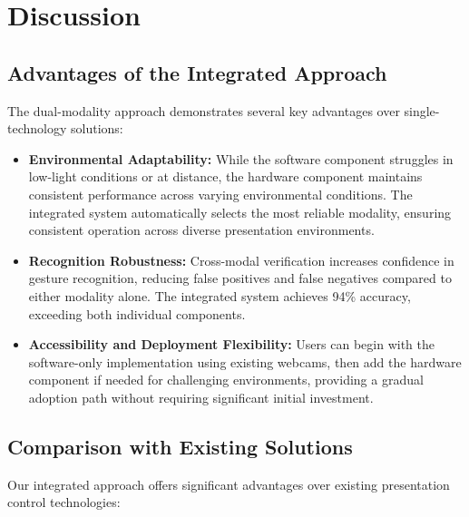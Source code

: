 \documentclass[arxiv,usenatbib]{iupartex}
\begin{document}
\section{Discussion}
\subsection{Advantages of the Integrated Approach}
The dual-modality approach demonstrates several key advantages over single-technology solutions:

\begin{itemize}
  \item \textbf{Environmental Adaptability:} While the software component struggles in low-light conditions or at distance, the hardware component maintains consistent performance across varying environmental conditions. The integrated system automatically selects the most reliable modality, ensuring consistent operation across diverse presentation environments.
  
  \item \textbf{Recognition Robustness:} Cross-modal verification increases confidence in gesture recognition, reducing false positives and false negatives compared to either modality alone. The integrated system achieves 94\% accuracy, exceeding both individual components.
  
  \item \textbf{Accessibility and Deployment Flexibility:} Users can begin with the software-only implementation using existing webcams, then add the hardware component if needed for challenging environments, providing a gradual adoption path without requiring significant initial investment.
\end{itemize}

\subsection{Comparison with Existing Solutions}
Our integrated approach offers significant advantages over existing presentation control technologies:
\end{document}

